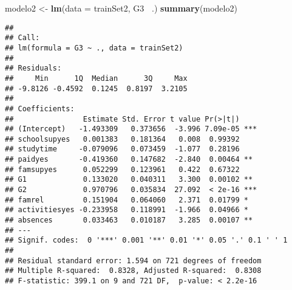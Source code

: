 \documentclass[
]{article}
\newenvironment{Shaded}{\begin{snugshade}}{\end{snugshade}}
\newcommand{\DataTypeTok}[1]{\textcolor[rgb]{0.13,0.29,0.53}{#1}}
\newcommand{\FloatTok}[1]{\textcolor[rgb]{0.00,0.00,0.81}{#1}}
\newcommand{\KeywordTok}[1]{\textcolor[rgb]{0.13,0.29,0.53}{\textbf{#1}}}
\newcommand{\NormalTok}[1]{#1}
\newcommand{\OperatorTok}[1]{\textcolor[rgb]{0.81,0.36,0.00}{\textbf{#1}}}
\newcommand{\OtherTok}[1]{\textcolor[rgb]{0.56,0.35,0.01}{#1}}
\newcommand{\StringTok}[1]{\textcolor[rgb]{0.31,0.60,0.02}{#1}}
\begin{document}
\begin{Shaded}
\end{Shaded}

\begin{Shaded}
\begin{Highlighting}[]
\NormalTok{modelo2 <-}\StringTok{ }\KeywordTok{lm}\NormalTok{(}\DataTypeTok{data =}\NormalTok{ trainSet2, G3 }\OperatorTok{~}\NormalTok{.)}
\KeywordTok{summary}\NormalTok{(modelo2)}
\end{Highlighting}
\end{Shaded}

\begin{verbatim}
## 
## Call:
## lm(formula = G3 ~ ., data = trainSet2)
## 
## Residuals:
##     Min      1Q  Median      3Q     Max 
## -9.8126 -0.4592  0.1245  0.8197  3.2105 
## 
## Coefficients:
##                Estimate Std. Error t value Pr(>|t|)    
## (Intercept)   -1.493309   0.373656  -3.996 7.09e-05 ***
## schoolsupyes   0.001383   0.181364   0.008  0.99392    
## studytime     -0.079096   0.073459  -1.077  0.28196    
## paidyes       -0.419360   0.147682  -2.840  0.00464 ** 
## famsupyes      0.052299   0.123961   0.422  0.67322    
## G1             0.133020   0.040311   3.300  0.00102 ** 
## G2             0.970796   0.035834  27.092  < 2e-16 ***
## famrel         0.151904   0.064060   2.371  0.01799 *  
## activitiesyes -0.233958   0.118991  -1.966  0.04966 *  
## absences       0.033463   0.010187   3.285  0.00107 ** 
## ---
## Signif. codes:  0 '***' 0.001 '**' 0.01 '*' 0.05 '.' 0.1 ' ' 1
## 
## Residual standard error: 1.594 on 721 degrees of freedom
## Multiple R-squared:  0.8328, Adjusted R-squared:  0.8308 
## F-statistic: 399.1 on 9 and 721 DF,  p-value: < 2.2e-16
\end{verbatim}
\end{document}
